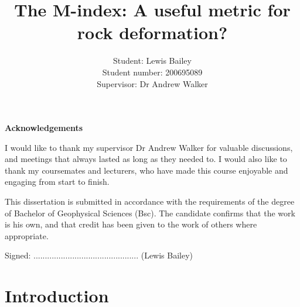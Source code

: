 \documentclass[a4paper,12pt,twoside]{report}
\title{\textbf{The M-index: A useful metric for rock deformation?}}
\author{Student: Lewis Bailey\\Student number: 200695089\\Supervisor: Dr Andrew Walker}
\date{}
\numberwithin{equation}{chapter}
\begin{document}

\maketitle
%
%	
%	



\vspace{3cm}
\begin{center}
\begin{Large}
\textbf{Acknowledgements}
\end{Large}

I would like to thank my supervisor Dr Andrew Walker for valuable discussions, and meetings that always lasted as long as they needed to. I would also like to thank my coursemates and lecturers, who have made this course enjoyable and engaging from start to finish.
  
\vspace{3cm}
\noindent
\begin{Large}
\end{Large}

This dissertation is submitted in accordance with the requirements of the degree of Bachelor of Geophysical Sciences (Bsc). The candidate confirms that the work is his own, and that credit has been given to the work of others where appropriate.

\vspace{1cm}
\noindent
Signed: .............................................. (Lewis Bailey)
\end{center}
\tableofcontents
\listoffigures
\listoftables

\chapter{Introduction} \label{chap:intro}
\vspace{-1cm}
\end{document}
